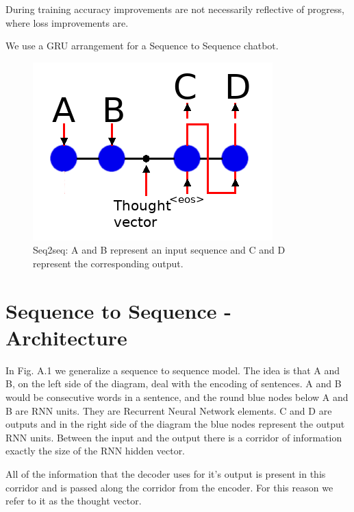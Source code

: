 During training accuracy improvements are not necessarily reflective of progress, where loss
improvements are.

We use a GRU arrangement for a Sequence to Sequence chatbot.


\begin{figure}[H]

\begin{center}

\includegraphics[scale=0.5]{diagram-nmt}

	
\end{center}

\caption[Sequnce to Sequence]{Seq2seq: A and B represent an input sequence and C and D represent the corresponding output.}

\end{figure}


\section{Sequence to Sequence - Architecture}

In Fig. A.1 we generalize a sequence to sequence model. The idea is
that A and B, on the left side of the diagram, deal with the encoding
of sentences. A and B would be consecutive words in a sentence, and
the round blue nodes below A and B are RNN units. They are Recurrent
Neural Network elements. C and D are outputs and in the right side
of the diagram the blue nodes represent the output RNN units. Between
the input and the output there is a corridor of information exactly
the size of the RNN hidden vector. 

All of the information that the decoder uses for it\textquoteright s
output is present in this corridor and is passed along the corridor
from the encoder. For this reason we refer to it as the thought vector.

